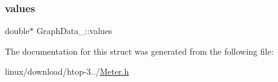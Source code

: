 \subsubsection{\texorpdfstring{values}{values}}
{\footnotesize\ttfamily double$\ast$ Graph\+Data\+\_\+\+::values}



The documentation for this struct was generated from the following file\+:\begin{DoxyCompactItemize}
\item 
linux/download/htop-\/3../\hyperlink{Meter_8h}{Meter.\+h}\end{DoxyCompactItemize}
